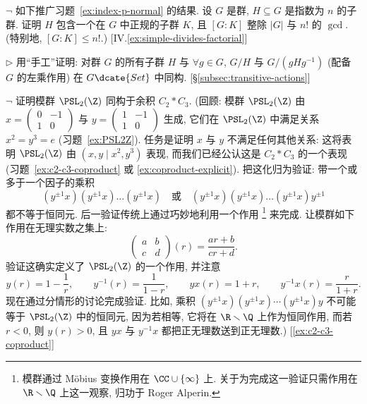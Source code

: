 \begin{prob}
\label{ex:index-n-kernel}
$\neg$ 如下推广习题~\ref{ex:index-p-normal} 的结果. 设 $G$ 是群, $H \subseteq G$ 是指数为 $n$ 的子群. 证明 $H$ 包含一个在 $G$ 中正规的子群 $K$, 且 $[G:K]$ 整除 $|G|$ 与 $n!$ 的 $\gcd$. (特别地, $[G:K] \leq n!$.) [IV.\ref{ex:simple-divides-factorial}]
\end{prob}

\begin{prob}
\label{ex:GH-iso}
$\triangleright$ 用``手工''证明: 对群 $G$ 的所有子群 $H$ 与 $\forall g \in G$, $G/H$ 与 $G/(gHg^{-1})$ (配备 $G$ 的左乘作用) 在 $G\dcate{Set}$ 中同构. [\S\ref{subsec:transitive-actions}]
\end{prob}

\begin{prob}
\label{ex:PSL2-C2-C3}
$\neg$ 证明模群 $\PSL_2(\Z)$ 同构于余积 $C_2 * C_3$. (回顾: 模群 $\PSL_2(\Z)$ 由 $x = \begin{pmatrix} 0 & -1 \\ 1 & 0 \end{pmatrix}$ 与 $y = \begin{pmatrix} 1 & -1 \\ 1 & 0 \end{pmatrix}$ 生成, 它们在 $\PSL_2(\Z)$ 中满足关系 $x^2 = y^3 = e$ (习题~\ref{ex:PSL2Z}). 任务是证明 $x$ 与 $y$ 不满足任何其他关系: 这将表明 $\PSL_2(\Z)$ 由 $(x, y \mid x^2, y^3)$ 表现, 而我们已经公认这是 $C_2 * C_3$ 的一个表现 (习题~\ref{ex:c2-c3-coproduct} 或 \ref{ex:coproduct-explicit}). 把这化归为验证: 带一个或多于一个因子的乘积
\[
(y^{\pm 1} x)(y^{\pm 1} x) \dots (y^{\pm 1} x) \quad \text{或} \quad (y^{\pm 1} x)(y^{\pm 1} x) \dots (y^{\pm 1} x) y^{\pm 1}
\]
都不等于恒同元. 后一验证传统上通过巧妙地利用一个作用%
\footnote{模群通过 M\"obius 变换作用在 $\CC \cup \{\infty\}$ 上. 关于为完成这一验证只需作用在 $\R \smallsetminus \Q$ 上这一观察, 归功于 Roger Alperin.}%
来完成. 让模群如下作用在无理实数之集上:
\[
\begin{pmatrix} a & b \\ c & d \end{pmatrix}(r) = \frac{ar + b}{cr + d}.
\]
验证这确实定义了 $\PSL_2(\Z)$ 的一个作用, 并注意
\[
y(r) = 1 - \frac{1}{r}, \qquad y^{-1}(r) = \frac{1}{1-r}, \qquad yx(r) = 1 + r, \qquad y^{-1}x(r) = \frac{r}{1+r}.
\]
现在通过分情形的讨论完成验证. 比如, 乘积 $(y^{\pm 1} x)(y^{\pm 1} x) \cdots (y^{\pm 1} x) y$ 不可能等于 $\PSL_2(\Z)$ 中的恒同元, 因为若相等, 它将在 $\R \smallsetminus \Q$ 上作为恒同作用, 而若 $r < 0$, 则 $y(r) > 0$, 且 $yx$ 与 $y^{-1}x$ 都把正无理数送到正无理数.) [\ref{ex:c2-c3-coproduct}]
\end{prob}

